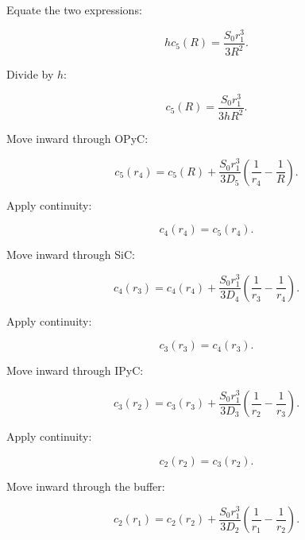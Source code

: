 \documentclass[11pt,a4paper]{article}
\begin{document}
Equate the two expressions:

\begin{equation}
hc_5(R)
=
\frac{S_0r_1^3}{3R^2}.
\tag{TRISO-ML-366}
\label{eq:triso-ml-366}
\end{equation}

Divide by $h$:

\begin{equation}
\boxed{
c_5(R)
=
\frac{S_0r_1^3}{3hR^2}.
}
\tag{TRISO-ML-367}
\label{eq:triso-ml-367}
\end{equation}

Move inward through OPyC:

\begin{equation}
c_5(r_4)
=
c_5(R)
+
\frac{S_0r_1^3}{3D_5}
\left(
\frac1{r_4}-\frac1R
\right).
\tag{TRISO-ML-368}
\label{eq:triso-ml-368}
\end{equation}

Apply continuity:

\begin{equation}
c_4(r_4)=c_5(r_4).
\tag{TRISO-ML-369}
\label{eq:triso-ml-369}
\end{equation}

Move inward through SiC:

\begin{equation}
c_4(r_3)
=
c_4(r_4)
+
\frac{S_0r_1^3}{3D_4}
\left(
\frac1{r_3}-\frac1{r_4}
\right).
\tag{TRISO-ML-370}
\label{eq:triso-ml-370}
\end{equation}

Apply continuity:

\begin{equation}
c_3(r_3)=c_4(r_3).
\tag{TRISO-ML-371}
\label{eq:triso-ml-371}
\end{equation}

Move inward through IPyC:

\begin{equation}
c_3(r_2)
=
c_3(r_3)
+
\frac{S_0r_1^3}{3D_3}
\left(
\frac1{r_2}-\frac1{r_3}
\right).
\tag{TRISO-ML-372}
\label{eq:triso-ml-372}
\end{equation}

Apply continuity:

\begin{equation}
c_2(r_2)=c_3(r_2).
\tag{TRISO-ML-373}
\label{eq:triso-ml-373}
\end{equation}

Move inward through the buffer:

\begin{equation}
c_2(r_1)
=
c_2(r_2)
+
\frac{S_0r_1^3}{3D_2}
\left(
\frac1{r_1}-\frac1{r_2}
\right).
\tag{TRISO-ML-374}
\label{eq:triso-ml-374}
\end{equation}
\end{document}
